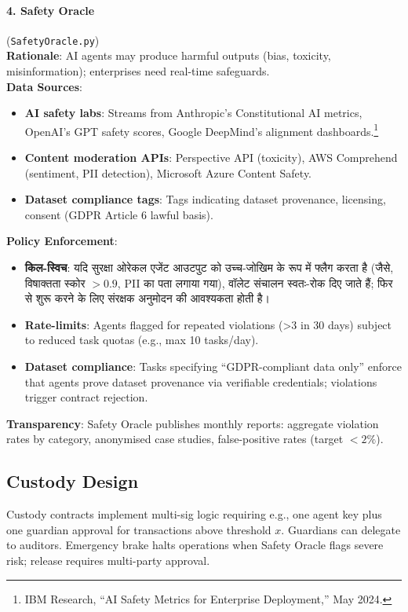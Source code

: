 \documentclass[11pt]{article}
\begin{document}
\paragraph{4. Safety Oracle} (\texttt{SafetyOracle.py})\\
\textbf{Rationale}: AI agents may produce harmful outputs (bias, toxicity, misinformation); enterprises need real-time safeguards.\\
\textbf{Data Sources}:
\begin{itemize}[noitemsep]
  \item \textbf{AI safety labs}: Streams from Anthropic's Constitutional AI metrics, OpenAI's GPT safety scores, Google DeepMind's alignment dashboards.\footnote{IBM Research, ``AI Safety Metrics for Enterprise Deployment,'' May 2024.}
  \item \textbf{Content moderation APIs}: Perspective API (toxicity), AWS Comprehend (sentiment, PII detection), Microsoft Azure Content Safety.
  \item \textbf{Dataset compliance tags}: Tags indicating dataset provenance, licensing, consent (GDPR Article 6 lawful basis).
\end{itemize}
\textbf{Policy Enforcement}:
\begin{itemize}[noitemsep]
  \item \textbf{किल-स्विच}: यदि सुरक्षा ओरेकल एजेंट आउटपुट को उच्च-जोखिम के रूप में फ्लैग करता है (जैसे, विषाक्तता स्कोर $>0.9$, PII का पता लगाया गया), वॉलेट संचालन स्वतः-रोक दिए जाते हैं; फिर से शुरू करने के लिए संरक्षक अनुमोदन की आवश्यकता होती है।
  \item \textbf{Rate-limits}: Agents flagged for repeated violations (>3 in 30 days) subject to reduced task quotas (e.g., max 10 tasks/day).
  \item \textbf{Dataset compliance}: Tasks specifying ``GDPR-compliant data only'' enforce that agents prove dataset provenance via verifiable credentials; violations trigger contract rejection.
\end{itemize}
\textbf{Transparency}: Safety Oracle publishes monthly reports: aggregate violation rates by category, anonymised case studies, false-positive rates (target $<2\%$).

\subsection{Custody Design}
Custody contracts implement multi-sig logic requiring e.g., one agent key plus one guardian approval for transactions above threshold $x$. Guardians can delegate to auditors. Emergency brake halts operations when Safety Oracle flags severe risk; release requires multi-party approval.
\end{document}

